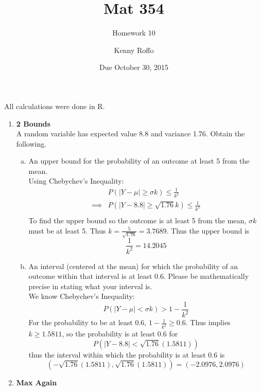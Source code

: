 \documentclass{scrartcl}
\title{Mat 354}
\subtitle{Homework 10}
\author{Kenny Roffo}
\date{Due October 30, 2015}
\begin{document}
\maketitle

All calculations were done in R.

\begin{enumerate}

\item \textbf{2 Bounds}\\

A random variable has expected value 8.8 and variance 1.76. Obtain the following.

\begin{enumerate}[a)]
\item An upper bound for the probability of an outcome at least 5 from the mean.\\

Using Chebychev's Inequality:
\begin{align*}
  &P(|Y-\mu| \ge \sigma k) \le \frac{1}{k^2}\\
  \implies &P(|Y-8.8| \ge \sqrt{1.76}k)  \le \frac{1}{k^2}\\
\end{align*}
To find the upper bound so the outcome is at least 5 from the mean, $\sigma k$ must be at least 5. Thus $k=\frac{5}{\sqrt{1.76}}=3.7689$. Thus the upper bound is $$\frac{1}{k^2} = 14.2045 $$

\item An interval (centered at the mean) for which the probability of an outcome within that interval is at least 0.6. Please be mathematically precise in stating what your interval is.\\

We know Chebychev's Inequality: $$P(|Y-\mu| < \sigma k) > 1 - \frac{1}{k^2}$$ For the probability to be at least 0.6, $1 - \frac{1}{k^2} \ge 0.6$. Thus implies $k \ge 1.5811$, so the probability is at least 0.6 for $$P(|Y-8.8| < \sqrt{1.76}(1.5811))$$ thus the interval within which the probability is at least 0.6 is $$(-\sqrt{1.76}(1.5811),\sqrt{1.76}(1.5811)) = (-2.0976,2.0976)$$

\end{enumerate}

\item \textbf{Max Again}


\end{enumerate}
\end{document}
